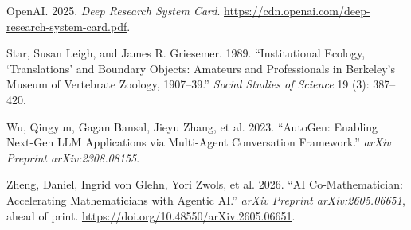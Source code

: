 \documentclass[
  nonatbib,
  preprint]{article}
\newlength{\cslhangindent}
\newenvironment{CSLReferences}[2] %
 {\begin{list}{}{%
  \setlength{\itemindent}{0pt}
  \setlength{\leftmargin}{0pt}
  \setlength{\parsep}{0pt}
  \ifodd #1
   \setlength{\leftmargin}{\cslhangindent}
   \setlength{\itemindent}{-1\cslhangindent}
  \fi
  \setlength{\itemsep}{#2\baselineskip}}}
 {\end{list}}
\begin{document}
\begin{CSLReferences}{1}{1}
OpenAI. 2025. \emph{Deep Research System Card}.
\url{https://cdn.openai.com/deep-research-system-card.pdf}.

Star, Susan Leigh, and James R. Griesemer. 1989. {``Institutional
Ecology, {`Translations'} and Boundary Objects: Amateurs and
Professionals in Berkeley's Museum of Vertebrate Zoology, 1907--39.''}
\emph{Social Studies of Science} 19 (3): 387--420.

Wu, Qingyun, Gagan Bansal, Jieyu Zhang, et al. 2023. {``{AutoGen}:
Enabling Next-Gen {LLM} Applications via Multi-Agent Conversation
Framework.''} \emph{arXiv Preprint arXiv:2308.08155}.

Zheng, Daniel, Ingrid von Glehn, Yori Zwols, et al. 2026. {``{AI}
Co-Mathematician: Accelerating Mathematicians with Agentic {AI}.''}
\emph{arXiv Preprint arXiv:2605.06651}, ahead of print.
\url{https://doi.org/10.48550/arXiv.2605.06651}.

\end{CSLReferences}
\end{document}
